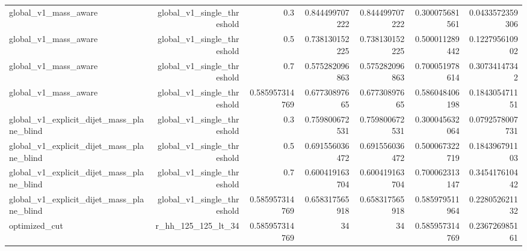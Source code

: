 \begin{table}[htbp]
{\begin{tabular}{lrrrrrr}
global\_v1\_mass\_aware & global\_v1\_single\_threshold & 0.3 & 0.844499707222 & 0.844499707222 & 0.300075681561 & 0.0433572359306 \\
global\_v1\_mass\_aware & global\_v1\_single\_threshold & 0.5 & 0.738130152225 & 0.738130152225 & 0.500011289442 & 0.122795610902 \\
global\_v1\_mass\_aware & global\_v1\_single\_threshold & 0.7 & 0.575282096863 & 0.575282096863 & 0.700051978614 & 0.30734147342 \\
global\_v1\_mass\_aware & global\_v1\_single\_threshold & 0.585957314769 & 0.67730897665 & 0.67730897665 & 0.586048406198 & 0.184305471151 \\
global\_v1\_explicit\_dijet\_mass\_plane\_blind & global\_v1\_single\_threshold & 0.3 & 0.759800672531 & 0.759800672531 & 0.300045632064 & 0.0792578007731 \\
global\_v1\_explicit\_dijet\_mass\_plane\_blind & global\_v1\_single\_threshold & 0.5 & 0.691556036472 & 0.691556036472 & 0.500067322719 & 0.184396791103 \\
global\_v1\_explicit\_dijet\_mass\_plane\_blind & global\_v1\_single\_threshold & 0.7 & 0.600419163704 & 0.600419163704 & 0.700062313147 & 0.345417610442 \\
global\_v1\_explicit\_dijet\_mass\_plane\_blind & global\_v1\_single\_threshold & 0.585957314769 & 0.658317565918 & 0.658317565918 & 0.585979511964 & 0.228052621132 \\
optimized\_cut & r\_hh\_125\_125\_lt\_34 & 0.585957314769 & 34 & 34 & 0.585957314769 & 0.236726985161 \\
\bottomrule
\end{tabular}
}
\end{table}
